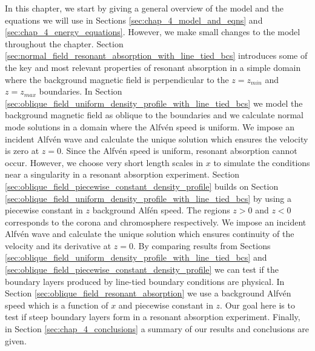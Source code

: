 In this chapter, we start by giving a general overview of the model and the equations we will use in Sections \ref{sec:chap_4_model_and_eqns} and \ref{sec:chap_4_energy_equations}. However, we make small changes to the model throughout the chapter. Section \ref{sec:normal_field_resonant_absorption_with_line_tied_bcs} introduces some of the key and most relevant properties of resonant absorption in a simple domain where the background magnetic field is perpendicular to the $z=z_{min}$ and $z=z_{max}$ boundaries. In Section \ref{sec:oblique_field_uniform_density_profile_with_line_tied_bcs} we model the background magnetic field as oblique to the boundaries and we calculate normal mode solutions in a domain where the Alfv\'en speed is uniform. We impose an incident Alfv\'en wave and calculate the unique solution which ensures the velocity is zero at $z=0$. Since the Alfv\'en speed is uniform, resonant absorption cannot occur. However, we choose very short length scales in $x$ to simulate the conditions near a singularity in a resonant absorption experiment. Section \ref{sec:oblique_field_piecewise_constant_density_profile} builds on Section \ref{sec:oblique_field_uniform_density_profile_with_line_tied_bcs} by using a piecewise constant in $z$ background Alf\'en speed. The regions $z>0$ and $z<0$ corresponds to the corona and chromosphere respectively. We impose an incident Alfv\'en wave and calculate the unique solution which ensures continuity of the velocity and its derivative at $z=0$. By comparing results from Sections \ref{sec:oblique_field_uniform_density_profile_with_line_tied_bcs} and \ref{sec:oblique_field_piecewise_constant_density_profile} we can test if the boundary layers produced by line-tied boundary conditions are physical. In Section \ref{sec:oblique_field_resonant_absorption} we use a background Alfv\'en speed which is a function of $x$ and piecewise constant in $z$. Our goal here is to test if steep boundary layers form in a resonant absorption experiment. Finally, in Section \ref{sec:chap_4_conclusions} a summary of our results and conclusions are given.


